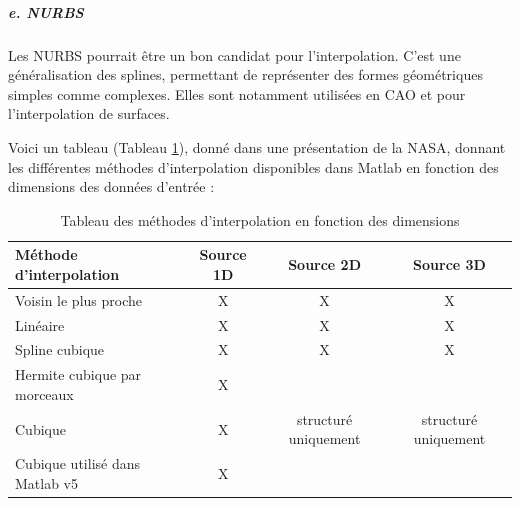 \subparagraph{e. NURBS}

Les \ac{NURBS}\cite{piegl1995nurbs} pourrait être un bon candidat pour l'interpolation. C'est une généralisation des splines, permettant de représenter des formes géométriques simples comme complexes. Elles sont notamment utilisées en CAO et pour l'interpolation de surfaces.\cite{surface}

Voici un tableau (Tableau \ref{tab:interpolation_methods}), donné dans une présentation de la NASA\cite{nasa}, donnant les différentes méthodes d'interpolation disponibles dans Matlab en fonction des dimensions des données d'entrée :
\begin{table}[ht]
    \centering
    \begin{tabular}{|l|c|c|c|}
    \hline
    \textbf{Méthode d'interpolation} & \textbf{Source 1D} & \textbf{Source 2D} & \textbf{Source 3D} \\ \hline
    Voisin le plus proche & X & X & X \\ \hline
    Linéaire & X & X & X \\ \hline
    Spline cubique & X & X & X \\ \hline
    Hermite cubique par morceaux & X & & \\ \hline
    Cubique & X & structuré uniquement & structuré uniquement \\ \hline %
    Cubique utilisé dans Matlab v5 & X & & \\ \hline
    \end{tabular}
    \caption{Tableau des méthodes d'interpolation en fonction des dimensions}
    \label{tab:interpolation_methods}
\end{table}


